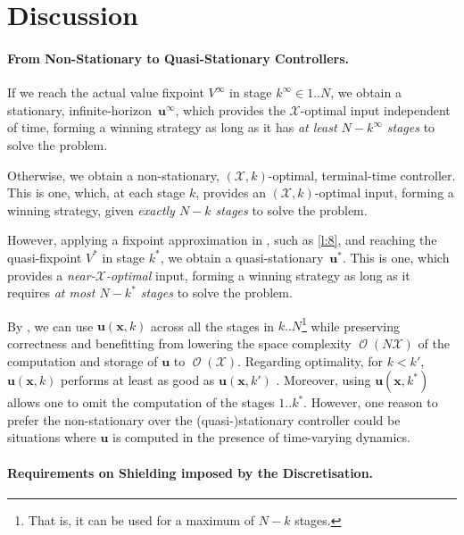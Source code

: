 \documentclass{article}
\newcommand\mmHxeoG[1]{\operatorname{\mathcal{O}}(#1)}
\newcommand\mijCQyI[1][]{V^{#1}}
\renewcommand\vec[1]{\mathbf{#1}}
\begin{document}
{\section{Discussion}
\label{l:27}

\paragraph{From Non-Stationary to Quasi-Stationary Controllers.}

If we reach the 
actual value fixpoint $\mijCQyI[\infty]$ in stage
$k^\infty\in 1..N$, we obtain a stationary,
infinite-horizon~${\vec{u}}^\infty$, which provides the
$\mathcal{X}$-optimal input independent of time, forming a winning
strategy as long as it has \emph{at least $N-k^\infty$
  stages} to solve the problem.

Otherwise, we obtain a non-stationary, $(\mathcal{X},k)$-optimal,
terminal-time controller.  This is one, which, at each stage
$k$, provides an $(\mathcal{X},k)$-optimal input, forming a
winning strategy, given \emph{exactly $N-k$ stages} to
solve the problem. 

However, applying a fixpoint approximation in , such as
\eqref{l:8}, and reaching the quasi-fixpoint
$\mijCQyI[*]$ in stage $k^*$, we obtain a 
quasi-stationary~${\vec{u}}^*$.  This is one, which provides a
\emph{near-$\mathcal{X}$-optimal} input, forming a winning strategy as
long as it requires \emph{at most $N-k^*$ stages} to
solve the problem.

By , we can use ${\vec{u}}({\vec{x}},k)$
across all the stages in $k..N$\footnote{That is, it
  can be used for a maximum of $N-k$ stages.}
while preserving correctness and benefitting from lowering the space
complexity $\mmHxeoG{N\mathcal{X}}$
of the computation and storage of ${\vec{u}}$ to
$\mmHxeoG{\mathcal{X}}$. 
Regarding optimality, for $k<k'$,
${\vec{u}}({\vec{x}},k)$ performs at least as good as
${\vec{u}}({\vec{x}},k')$
\cite[Fig.~9]{Gleirscher2025-ParametricModelOptimal}.
Moreover, using ${\vec{u}}({\vec{x}},k^*)$ allows one to omit the
computation of the stages $1..k^*$.
However, one reason to prefer the non-stationary over the
(quasi-)stationary controller could be situations where
${\vec{u}}$ is computed in the presence of time-varying dynamics.

\paragraph{Requirements on Shielding imposed by the Discretisation.}

}
\end{document}
